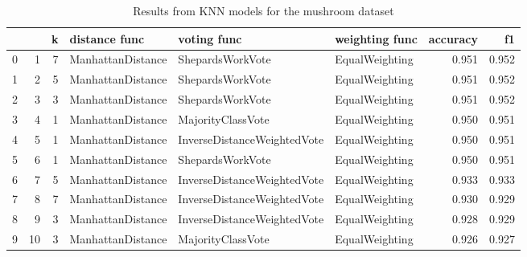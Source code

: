 \begin{table}
\centering
\caption{Results from KNN models for the mushroom dataset}
\begin{tabular}{lrrlllrr}
\toprule
 &  & k & distance func & voting func & weighting func & accuracy & f1 \\
\midrule
0 & 1 & 7 & ManhattanDistance & ShepardsWorkVote & EqualWeighting & 0.951 & 0.952 \\
1 & 2 & 5 & ManhattanDistance & ShepardsWorkVote & EqualWeighting & 0.951 & 0.952 \\
2 & 3 & 3 & ManhattanDistance & ShepardsWorkVote & EqualWeighting & 0.951 & 0.952 \\
3 & 4 & 1 & ManhattanDistance & MajorityClassVote & EqualWeighting & 0.950 & 0.951 \\
4 & 5 & 1 & ManhattanDistance & InverseDistanceWeightedVote & EqualWeighting & 0.950 & 0.951 \\
5 & 6 & 1 & ManhattanDistance & ShepardsWorkVote & EqualWeighting & 0.950 & 0.951 \\
6 & 7 & 5 & ManhattanDistance & InverseDistanceWeightedVote & EqualWeighting & 0.933 & 0.933 \\
7 & 8 & 7 & ManhattanDistance & InverseDistanceWeightedVote & EqualWeighting & 0.930 & 0.929 \\
8 & 9 & 3 & ManhattanDistance & InverseDistanceWeightedVote & EqualWeighting & 0.928 & 0.929 \\
9 & 10 & 3 & ManhattanDistance & MajorityClassVote & EqualWeighting & 0.926 & 0.927 \\
\bottomrule
\end{tabular}
\end{table}

